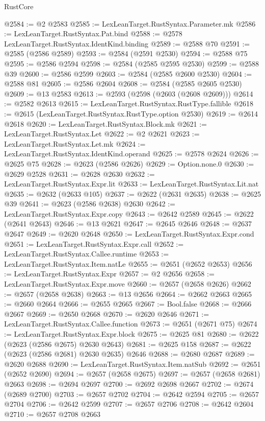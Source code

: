\begin{lexlean}{RustCore}
\begin{coremodule}
@2584 := @2 @2583
@2585 := LexLeanTarget.RustSyntax.Parameter.mk
@2586 := LexLeanTarget.RustSyntax.Pat.bind
@2588 := @2578 LexLeanTarget.RustSyntax.IdentKind.binding
@2589 := @2588 @70
@2591 := @2585 (@2586 @2589)
@2593 := @2584 (@2591 @2530)
@2594 := @2588 @75
@2595 := @2586 @2594
@2598 := @2584 (@2585 @2595 @2530)
@2599 := @2588 @39
@2600 := @2586 @2599
@2603 := @2584 (@2585 @2600 @2530)
@2604 := @2588 @81
@2605 := @2586 @2604
@2608 := @2584 (@2585 @2605 @2530)
@2609 := @13 @2583
@2613 := @2593 (@2598 (@2603 (@2608 @2609)))
@2614 := @2582 @2613
@2615 := LexLeanTarget.RustSyntax.RustType.fallible
@2618 := @2615 (LexLeanTarget.RustSyntax.RustType.option @2530)
@2619 := @2614 @2618
@2620 := LexLeanTarget.RustSyntax.Block.mk
@2621 := LexLeanTarget.RustSyntax.Let
@2622 := @2 @2621
@2623 := LexLeanTarget.RustSyntax.Let.mk
@2624 := LexLeanTarget.RustSyntax.IdentKind.operand
@2625 := @2578 @2624
@2626 := @2625 @75
@2628 := @2623 (@2586 @2626)
@2629 := Option.none.{0}
@2630 := @2629 @2528
@2631 := @2628 @2630
@2632 := LexLeanTarget.RustSyntax.Expr.lit
@2633 := LexLeanTarget.RustSyntax.Lit.nat
@2635 := @2632 (@2633 @105)
@2637 := @2622 (@2631 @2635)
@2638 := @2625 @39
@2641 := @2623 (@2586 @2638) @2630
@2642 := LexLeanTarget.RustSyntax.Expr.copy
@2643 := @2642 @2589
@2645 := @2622 (@2641 @2643)
@2646 := @13 @2621
@2647 := @2645 @2646
@2648 := @2637 @2647
@2649 := @2620 @2648
@2650 := LexLeanTarget.RustSyntax.Expr.cond
@2651 := LexLeanTarget.RustSyntax.Expr.call
@2652 := LexLeanTarget.RustSyntax.Callee.runtime
@2653 := LexLeanTarget.RustSyntax.Item.natLe
@2655 := @2651 (@2652 @2653)
@2656 := LexLeanTarget.RustSyntax.Expr
@2657 := @2 @2656
@2658 := LexLeanTarget.RustSyntax.Expr.move
@2660 := @2657 (@2658 @2626)
@2662 := @2657 (@2658 @2638)
@2663 := @13 @2656
@2664 := @2662 @2663
@2665 := @2660 @2664
@2666 := @2655 @2665
@2667 := Bool.false
@2668 := @2666 @2667
@2669 := @2650 @2668
@2670 := @2620 @2646
@2671 := LexLeanTarget.RustSyntax.Callee.function
@2673 := @2651 (@2671 @75)
@2674 := LexLeanTarget.RustSyntax.Expr.block
@2675 := @2625 @81
@2680 := @2622 (@2623 (@2586 @2675) @2630 @2643)
@2681 := @2625 @158
@2687 := @2622 (@2623 (@2586 @2681) @2630 @2635) @2646
@2688 := @2680 @2687
@2689 := @2620 @2688
@2690 := LexLeanTarget.RustSyntax.Item.natSub
@2692 := @2651 (@2652 @2690)
@2694 := @2657 (@2658 @2675)
@2697 := @2657 (@2658 @2681) @2663
@2698 := @2694 @2697
@2700 := @2692 @2698 @2667
@2702 := @2674 (@2689 @2700)
@2703 := @2657 @2702
@2704 := @2642 @2594
@2705 := @2657 @2704
@2706 := @2642 @2599
@2707 := @2657 @2706
@2708 := @2642 @2604
@2710 := @2657 @2708 @2663

\end{coremodule}
\end{lexlean}
